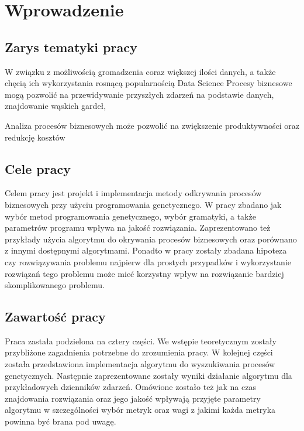 \chapter{Wprowadzenie}
\label{cha:wprowadzenie}


\section{Zarys tematyki pracy}
\label{sec:zarysPracy}
W związku z możliwością gromadzenia coraz większej ilości danych, a także chęcią ich wykorzystania rosnącą popularnością Data Science 
Procesy biznesowe mogą pozwolić na przewidywanie przyszłych zdarzeń na podstawie danych, znajdowanie wąskich gardeł,

Analiza procesów biznesowych może pozwolić na zwiększenie produktywności oraz redukcję kosztów
 


\section{Cele pracy}
\label{sec:celePracy}

Celem pracy jest projekt i implementacja metody odkrywania procesów biznesowych przy użyciu programowania genetycznego. W pracy zbadano jak wybór metod programowania genetycznego, wybór gramatyki, a także parametrów programu wpływa na jakość rozwiązania. Zaprezentowano też przykłady użycia algorytmu do okrywania procesów biznesowych oraz porównano z innymi dostępnymi algorytmami. Ponadto w pracy zostały zbadana hipoteza czy rozwiązywania problemu najpierw dla prostych przypadków i wykorzystanie rozwiązań tego problemu może mieć korzystny wpływ na rozwiązanie bardziej skomplikowanego problemu.

\section{Zawartość pracy}
\label{sec:zawartoscPracy}

Praca zastała podzielona na cztery części. We wstępie teoretycznym zostały przybliżone zagadnienia potrzebne do zrozumienia pracy. W kolejnej części została przedstawiona implementacja algorytmu do wyszukiwania procesów genetycznych. Następnie zaprezentowane zostały wyniki działanie algorytmu dla przykładowych dzienników zdarzeń. Omówione zostało też jak na czas znajdowania rozwiązania oraz jego jakość wpływają przyjęte parametry algorytmu w szczególności wybór metryk oraz wagi z jakimi każda metryka powinna być brana pod uwagę.  


















